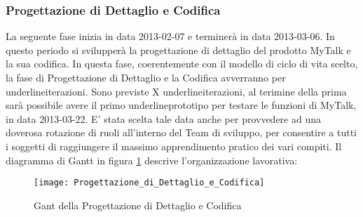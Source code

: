 \subsubsection{Progettazione di Dettaglio e Codifica}
La seguente fase inizia in data 2013-02-07 e terminerà in data 2013-03-06. In questo periodo si svilupperà la progettazione di dettaglio del prodotto MyTalk e la sua codifica.
In questa fase, coerentemente con il modello di ciclo di vita scelto, la fase di Progettazione di Dettaglio e la Codifica avverranno per underline{iterazioni}.
Sono previste X underline{iterazioni}, al terimine della prima sarà possibile avere il primo underline{prototipo} per testare le funzioni di MyTalk, in data 2013-03-22.
E' stata scelta tale data anche per provvedere ad una doverosa rotazione di ruoli all'interno del Team di sviluppo, per consentire a tutti i soggetti di raggiungere il massimo apprendimento pratico dei vari compiti.
Il diagramma di Gantt in figura \ref{fig:gantdc} descrive l'organizzazione lavorativa:\\

\begin{figure}[h!]
  \texttt{[image: Progettazione\_di\_Dettaglio\_e\_Codifica]}
\caption{Gant della Progettazione di Dettaglio e Codifica}\label{fig:gantdc}
\end{figure}

